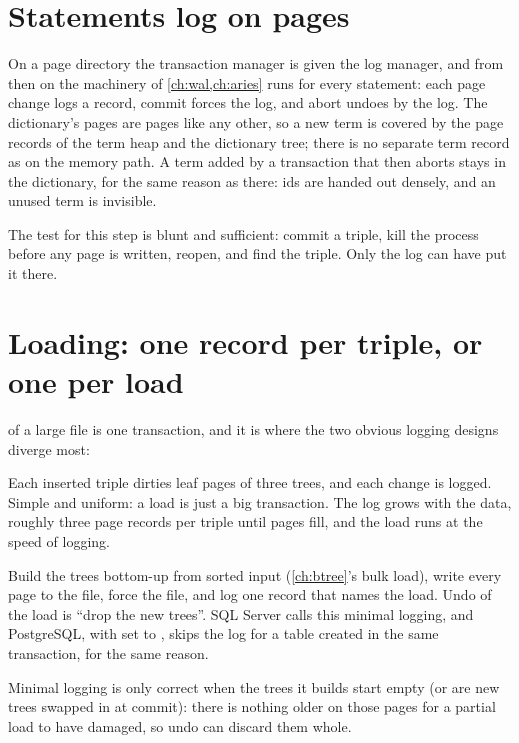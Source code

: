 \section{Statements log on pages}

On a page directory the transaction manager is given the log manager, and from
then on the machinery of \cref{ch:wal,ch:aries} runs for every statement:
each page change logs a record, commit forces the log, and abort undoes by the
log. The dictionary's pages are pages like any other, so a new term is covered
by the page records of the term heap and the dictionary tree; there is no
separate term record as on the memory path. A term added by a transaction that
then aborts stays in the dictionary, for the same reason as there: ids are
handed out densely, and an unused term is invisible.

The test for this step is blunt and sufficient: commit a triple, kill the
process before any page is written, reopen, and find the triple. Only the log
can have put it there.

\section{Loading: one record per triple, or one per load}

 of a large file is one transaction, and it is where
the two obvious logging designs diverge most:

\begin{description}[leftmargin=1.2em]
\item[Log every change.] Each inserted triple dirties leaf pages of three
trees, and each change is logged. Simple and uniform: a load is just a big
transaction. The log grows with the data, roughly three page records per
triple until pages fill, and the load runs at the speed of logging.
\item[Minimal logging.] Build the trees bottom-up from sorted input
(\cref{ch:btree}'s bulk load), write every page to the file, force the file,
and log one record that names the load. Undo of the load is ``drop the new
trees''. SQL Server calls this minimal logging, and PostgreSQL, with
 set to , skips the log for a table created in
the same transaction, for the same reason.
\end{description}

Minimal logging is only correct when the trees it builds start empty (or are
new trees swapped in at commit): there is nothing older on those pages for a
partial load to have damaged, so undo can discard them whole.

